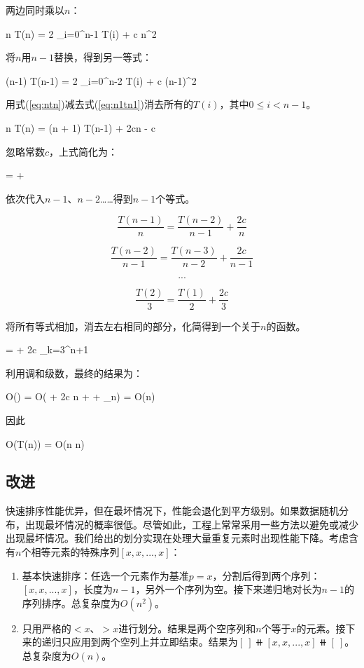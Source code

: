 \documentclass[b5paper]{ctexart}
\begin{document}
两边同时乘以$n$：

\be
n T(n) = 2 \sum_{i=0}^{n-1} T(i) + c n^2
\label{eq:ntn}
\ee

将$n$用$n-1$替换，得到另一等式：

\be
(n-1) T(n-1) = 2 \sum_{i=0}^{n-2} T(i) + c (n-1)^2
\label{eq:n1tn1}
\ee

用式(\ref{eq:ntn})减去式(\ref{eq:n1tn1})消去所有的$T(i)$，其中$0 \leq i < n-1$。

\be
n T(n) = (n + 1) T(n-1) + 2cn - c
\ee

忽略常数$c$，上式简化为：

\be
{} =  + 
\ee

依次代入$n-1$、$n-2$……得到$n-1$个等式。

\[
\frac{T(n-1)}{n} = \frac{T(n-2)}{n-1} + \frac{2c}{n}
\]

\[
\frac{T(n-2)}{n-1} = \frac{T(n-3)}{n-2} + \frac{2c}{n-1}
\]

\[
...
\]

\[
\frac{T(2)}{3} = \frac{T(1)}{2} + \frac{2c}{3}
\]

将所有等式相加，消去左右相同的部分，化简得到一个关于$n$的函数。

\be
{} =  + 2c \sum_{k=3}^{n+1} 
\ee

利用调和级数，最终的结果为：

\be
O() = O( + 2c \ln n + \gamma + \epsilon_n) = O(\lg n)
\ee

因此

\be
O(T(n)) = O(n \lg n)
\ee

\subsection{改进}
 

快速排序性能优异，但在最坏情况下，性能会退化到平方级别。如果数据随机分布，出现最坏情况的概率很低。尽管如此，工程上常常采用一些方法以避免或减少出现最坏情况。我们给出的划分实现在处理大量重复元素时出现性能下降。考虑含有$n$个相等元素的特殊序列$[x, x, ..., x]$：

\begin{enumerate}
\item 基本快速排序：任选一个元素作为基准$p = x$，分割后得到两个序列：$[x, x, ..., x]$，长度为$n-1$，另外一个序列为空。接下来递归地对长为$n-1$的序列排序。总复杂度为$O(n^2)$。
\item 只用严格的$< x$、$> x$进行划分。结果是两个空序列和$n$个等于$x$的元素。接下来的递归只应用到两个空列上并立即结束。结果为$[\ ] \doubleplus [x, x, ..., x] \doubleplus [\ ]$。总复杂度为$O(n)$。
\end{enumerate}
\end{document}
